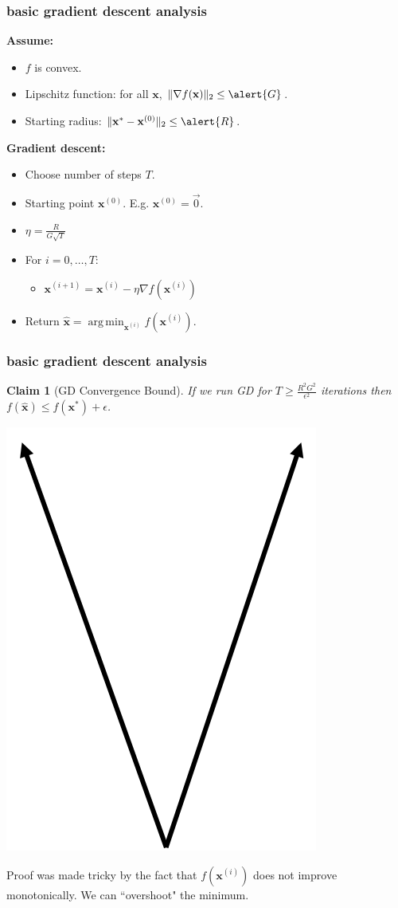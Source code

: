 \documentclass[compress]{beamer}
\newcommand{\bv}[1]{\mathbf{#1}}
\DeclareMathOperator*{\argmin}{arg\,min}
\newtheorem{claim}[theorem]{Claim}
\begin{document}
\begin{frame}[t]
	\frametitle{basic gradient descent analysis}
	\textbf{Assume:}
	\begin{itemize}
		\item $f$ is convex.
		\item Lipschitz function: for all $\bv{x}$, $\|\nabla f(\bv{x})\|_2 \leq \alert{G}$.
		\item Starting radius: $\|\bv{x}^{*} - \bv{x}^{(0)}\|_2 \leq \alert{R}$.
	\end{itemize}
	
	\textbf{Gradient descent:}
	\begin{itemize}
		\item Choose number of steps $T$.
		\item Starting point $\bv{x}^{(0)}$. E.g.  $\bv{x}^{(0)} = \vec{0}$.
		\item $\eta = \frac{R}{G\sqrt{T}}$
		\item For $i = 0,\ldots, T$:
		\begin{itemize}
			\item $\bv{x}^{(i+1)} = \bv{x}^{(i)} - \eta \nabla f(\bv{x}^{(i)})$
		\end{itemize}
		\item Return $\hat{\bv{x}} = \argmin_{\bv{x}^{(i)}} f(\bv{x}^{(i)})$.
	\end{itemize}
\end{frame}

\begin{frame}[t]
	\frametitle{basic gradient descent analysis}
	\begin{claim}[GD Convergence Bound]
		If we run GD for $T \geq \frac{R^2G^2}{\epsilon^2}$ iterations then $f(\hat{\bv{x}}) \leq f(\bv{x}^*) + \epsilon$.
	\end{claim}
	\begin{center}
		\includegraphics[width=.25\textwidth]{v_function.png}
	\end{center}


	Proof was made tricky by the fact that $f(\bv{x}^{(i)})$ does not improve monotonically. We can ``overshoot" the minimum.
\end{frame}
\end{document}
